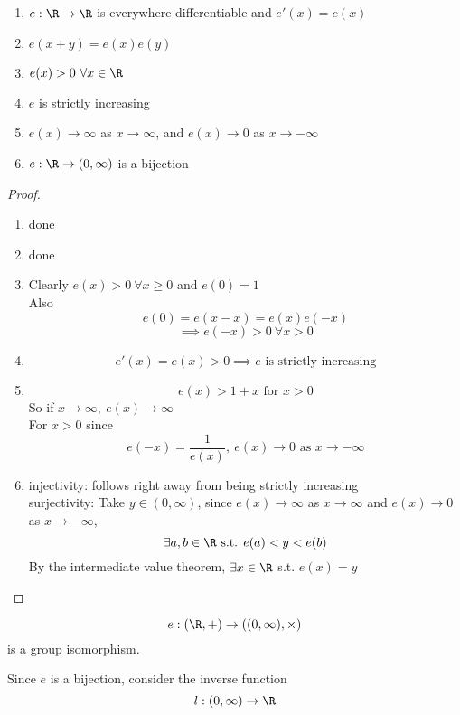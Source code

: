 \begin{theorem}
\hfill{ }
\begin{enumerate}
    \item $e:\R\to\R$ is everywhere differentiable and $e'(x) = e(x)$
    \item $e(x+y) = e(x)e(y)$
    \item $e(x)>0 \ \forall x\in \R$
    \item $e$ is strictly increasing
    \item $e(x)\to \infty$ as $x\to \infty$, and $e(x)\to 0$ as $x\to -\infty$
    \item $e:\R \to (0,\infty)$ is a bijection
\end{enumerate}
\begin{proof}
\hfill{ }
\begin{enumerate}
    \item done \tick
    \item done \tick
    \item Clearly $e(x)>0 \ \forall x\geq 0$ and $e(0)=1$\\
    Also
    \[e(0) = e(x-x) = e(x)e(-x)\]
    \[\implies e(-x)>0 \ \forall x >0\]
    \item \[e'(x) = e(x)>0\implies e\text{ is strictly increasing}\]
    \item \[e(x) > 1+x\text{ for }x>0\]
    So if $x\to \infty, \ e(x)\to \infty$\\
    For $x>0$ since
    \[e(-x) = \frac{1}{e(x)}, \ e(x) \to 0\text{ as }x\to -\infty\]
    \item injectivity: follows right away from being strictly increasing\\
    surjectivity: Take $y\in (0,\infty)$, since $e(x)\to \infty$ as $x\to \infty$ and $e(x)\to 0$ as $x\to -\infty$,
    \[\exists a,b\in \R \text{ s.t. }e(a)<y<e(b)\]
    By the intermediate value theorem, $\exists x\in \R$ s.t. $e(x)=y$
\end{enumerate}
\end{proof}
\end{theorem}
\begin{remark}
\[e:(\R,+) \to ((0,\infty),\times)\]
is a group isomorphism.
\end{remark}
\begin{normal}
Since $e$ is a bijection, consider the inverse function
\[l:(0,\infty)\to \R\]
\end{normal}

